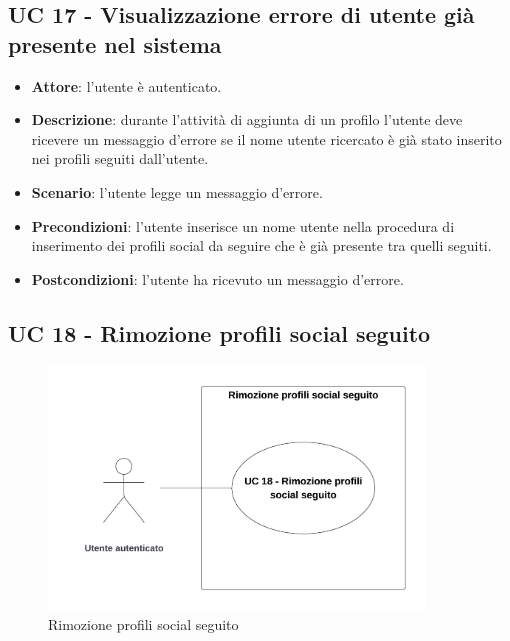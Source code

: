\subsection{UC 17 - Visualizzazione errore di utente già presente nel sistema}
\begin{itemize}
    \item \textbf{Attore}: l'utente è autenticato.
    \item \textbf{Descrizione}: durante l'attività di aggiunta di un profilo l'utente deve ricevere un messaggio d'errore se il nome utente ricercato è già stato inserito nei profili seguiti dall'utente.
    \item \textbf{Scenario}: l'utente legge un messaggio d'errore. 
    \item \textbf{Precondizioni}: l'utente inserisce un nome utente nella procedura di inserimento dei profili social da seguire che è già presente tra quelli seguiti.
    \item \textbf{Postcondizioni}: l'utente ha ricevuto un messaggio d'errore.
\end{itemize}

\subsection{UC 18 - Rimozione profili social seguito}

\begin{figure}[!h]
    \includegraphics[width=10cm]{sezioni/Images/UC18.png}
    \centering
    \caption{Rimozione profili social seguito}
\end{figure}

